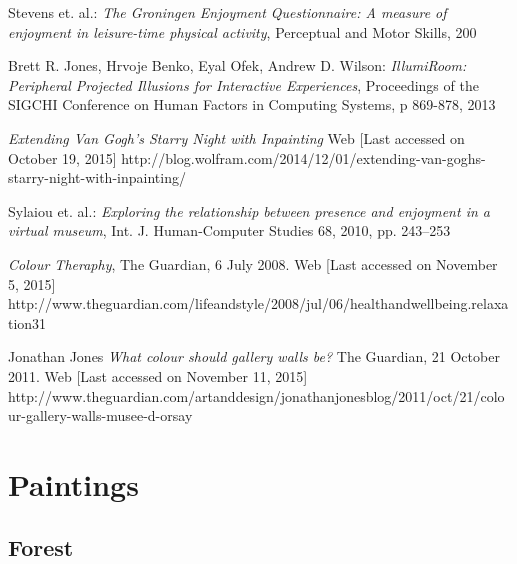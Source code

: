 \documentclass[a4paper]{article}
\begin{document}
\begin{thebibliography}{99}
 Stevens et. al.:
\emph{The Groningen Enjoyment Questionnaire: A measure of enjoyment in leisure-time physical activity},
Perceptual and Motor Skills, 200

 Brett R. Jones, Hrvoje Benko, Eyal Ofek, Andrew D. Wilson:
\emph{IllumiRoom: Peripheral Projected Illusions for
Interactive Experiences},
Proceedings of the SIGCHI Conference on Human Factors in Computing Systems, p 869-878, 2013

\emph{Extending Van Gogh’s \emph{Starry Night} with Inpainting}
Web [Last accessed on October 19, 2015]
http://blog.wolfram.com/2014/12/01/extending-van-goghs-starry-night-with-inpainting/

 Sylaiou et. al.:
\emph{Exploring the relationship between presence and enjoyment in a virtual museum},
Int. J. Human-Computer Studies 68, 2010, pp. 243--253

\emph{Colour Theraphy}, 
The Guardian, 6 July 2008.
Web [Last accessed on November 5, 2015]
http://www.theguardian.com/lifeandstyle/2008/jul/06/healthandwellbeing.relaxation31

 Jonathan Jones
\emph{What colour should gallery walls be?}
The Guardian, 21 October 2011.
Web [Last accessed on November 11, 2015]
http://www.theguardian.com/artanddesign/jonathanjonesblog/2011/oct/21/colour-gallery-walls-musee-d-orsay


\end{thebibliography}











\newpage

\appendix
\section{Paintings} \label{sec:paintings}

\subsection{Forest}
\end{document}
